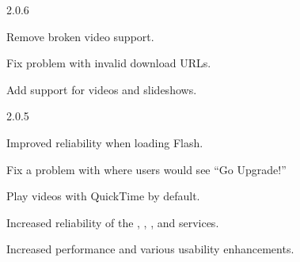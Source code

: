\begin{changelog}{2.0.6}
\item Remove broken  video support.
\item Fix problem with invalid  download URLs.
\item Add support for  videos and slideshows.
\end{changelog}

\begin{changelog}{2.0.5}
\item Improved reliability when loading Flash. 
\item Fix a problem with  where users would see ``Go Upgrade!'' 
\item Play videos with QuickTime by default.
\item Increased reliability of the , , , and  services.
\item Increased performance and various usability enhancements.
\end{changelog}
